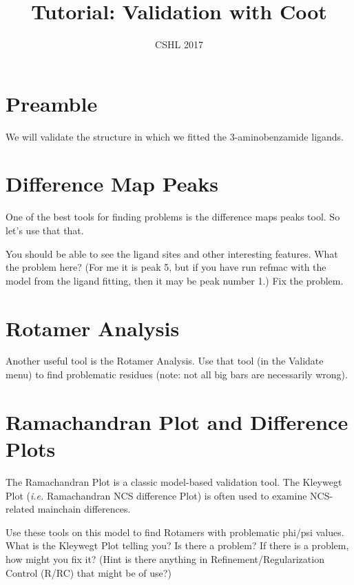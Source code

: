 \documentclass{article}
\title{Tutorial: Validation with Coot}
\author{CSHL 2017}
\begin{document}
\maketitle

\section{Preamble}

  We will validate the structure in which we fitted the
  3-aminobenzamide ligands.

\section{Difference Map Peaks}

  One of the best tools for finding problems is the difference maps
  peaks tool. So let's use that that.  

  You should be able to see the ligand sites and other interesting
  features. What the problem here? (For me it is peak 5, but if you
  have run refmac with the model from the ligand fitting, then it may
  be peak number 1.)  Fix the problem.

\section{Rotamer Analysis}
 
Another useful tool is the Rotamer Analysis.  Use that tool (in the
\textsf{Validate} menu) to find problematic residues (note: not all
big bars are necessarily wrong).





\section{Ramachandran Plot and Difference Plots}

The Ramachandran Plot is a classic model-based validation tool.  The
Kleywegt Plot (\emph{i.e.} Ramachandran NCS difference Plot) is often
used to examine NCS-related mainchain differences.

Use these tools on this model to find Rotamers with problematic
phi/psi values.  What is the Kleywegt Plot telling you? Is there a
problem? If there is a problem, how might you fix it? (Hint is there
anything in Refinement/Regularization Control (R/RC) that might be of
use?)
\end{document}
